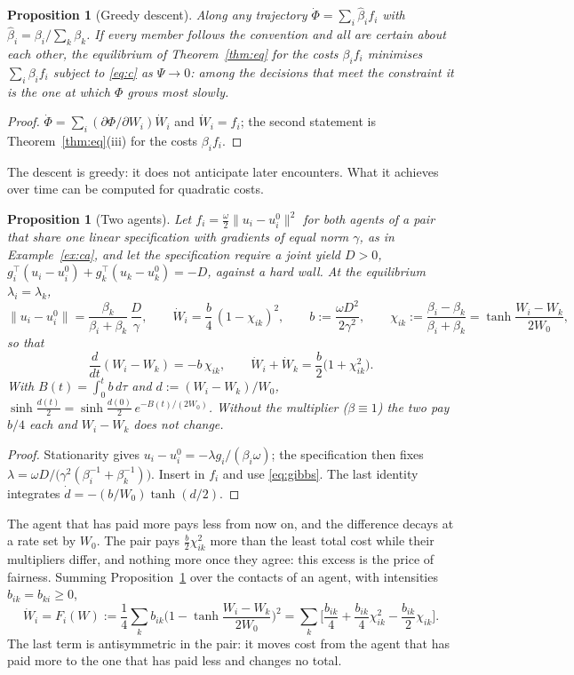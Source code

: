 \documentclass[11pt]{article}
\newtheorem{proposition}[theorem]{Proposition}
\theoremstyle{definition}
\theoremstyle{remark}
\begin{document}
\begin{proposition}[Greedy descent]\label{prop:greedy}
Along any trajectory $\dot\Phi=\sum_i\hat\beta_if_i$ with $\hat\beta_i=\beta_i/\sum_k\beta_k$. If every member follows the convention and all are certain about each other, the equilibrium of Theorem~\ref{thm:eq} for the costs $\beta_if_i$ minimises $\sum_i\beta_if_i$ subject to \eqref{eq:c} as $\Psi\to0$: among the decisions that meet the constraint it is the one at which $\Phi$ grows most slowly.
\end{proposition}
\begin{proof}
$\dot\Phi=\sum_i(\partial\Phi/\partial W_i)\dot W_i$ and $\dot W_i=f_i$; the second statement is Theorem~\ref{thm:eq}(iii) for the costs $\beta_if_i$.
\end{proof}

The descent is greedy: it does not anticipate later encounters. What it achieves over time can be computed for quadratic costs.

\begin{proposition}[Two agents]\label{prop:pair}
Let $f_i=\frac\omega2\|u_i-u_i^0\|^2$ for both agents of a pair that share one linear specification with gradients of equal norm $\gamma$, as in Example~\ref{ex:ca}, and let the specification require a joint yield $D>0$, $g_i^\top(u_i-u_i^0)+g_k^\top(u_k-u_k^0)=-D$, against a hard wall. At the equilibrium $\lambda_i=\lambda_k$,
\[
\|u_i-u_i^0\|=\frac{\beta_k}{\beta_i+\beta_k}\,\frac D\gamma,\qquad
\dot W_i=\frac b4\,(1-\chi_{ik})^2,\qquad b:=\frac{\omega D^2}{2\gamma^2},\qquad\chi_{ik}:=\frac{\beta_i-\beta_k}{\beta_i+\beta_k}=\tanh\frac{W_i-W_k}{2W_0},
\]
so that
\[
\frac d{dt}(W_i-W_k)=-b\,\chi_{ik},\qquad\dot W_i+\dot W_k=\frac b2\big(1+\chi_{ik}^2\big).
\]
With $B(t)=\int_0^tb\,d\tau$ and $d:=(W_i-W_k)/W_0$, $\sinh\frac{d(t)}2=\sinh\frac{d(0)}2\,e^{-B(t)/(2W_0)}$. Without the multiplier ($\beta\equiv1$) the two pay $b/4$ each and $W_i-W_k$ does not change.
\end{proposition}
\begin{proof}
Stationarity gives $u_i-u_i^0=-\lambda g_i/(\beta_i\omega)$; the specification then fixes $\lambda=\omega D/\big(\gamma^2(\beta_i^{-1}+\beta_k^{-1})\big)$. Insert in $f_i$ and use \eqref{eq:gibbs}. The last identity integrates $\dot d=-(b/W_0)\tanh(d/2)$.
\end{proof}

The agent that has paid more pays less from now on, and the difference decays at a rate set by $W_0$. The pair pays $\frac b2\chi_{ik}^2$ more than the least total cost while their multipliers differ, and nothing more once they agree: this excess is the price of fairness. Summing Proposition~\ref{prop:pair} over the contacts of an agent, with intensities $b_{ik}=b_{ki}\ge0$,
\begin{equation}\label{eq:Wdyn}
\dot W_i=F_i(W):=\frac14\sum_kb_{ik}\Big(1-\tanh\frac{W_i-W_k}{2W_0}\Big)^2
=\sum_k\Big[\frac{b_{ik}}4+\frac{b_{ik}}4\chi_{ik}^2-\frac{b_{ik}}2\chi_{ik}\Big].
\end{equation}
The last term is antisymmetric in the pair: it moves cost from the agent that has paid more to the one that has paid less and changes no total.
\end{document}
